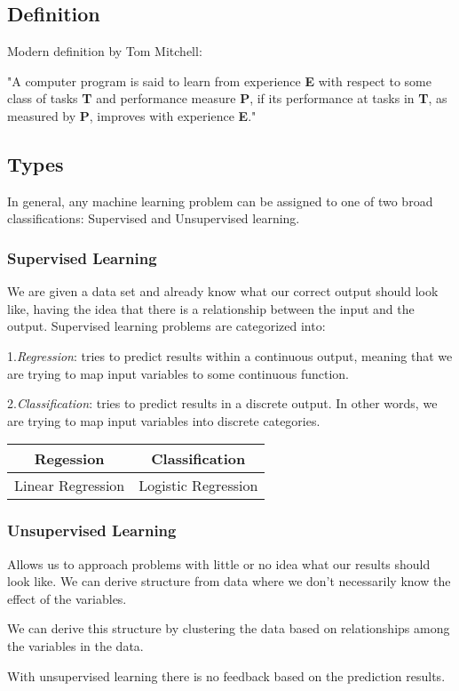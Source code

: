 \subsection{Definition}

Modern definition by Tom Mitchell: 
\begin{displayquote}
"A computer program is said to learn from experience \textbf{E} with respect to some class of tasks \textbf{T} and performance measure \textbf{P}, if its performance at tasks in \textbf{T}, as measured by \textbf{P}, improves with experience \textbf{E}."
\end{displayquote}

\subsection{Types}
In general, any machine learning problem can be assigned to one of two broad classifications: Supervised and Unsupervised learning.

\subsubsection{Supervised Learning}
We are given a data set and already know what our correct output should look like, having the idea that there is a relationship between the input and the output.
Supervised learning problems are categorized into:

1.\textit{Regression}: tries to predict results within a continuous output, meaning that we are trying to map input variables to some continuous function.

2.\textit{Classification}: tries to predict results in a discrete output. In other words, we are trying to map input variables into discrete categories.

\begin{center}
\begin{tabular}{ |c|c| } 
\hline
\textbf{Regession} & \textbf{Classification} \\
\hline
Linear Regression & Logistic Regression \\
\hline
\end{tabular}
\end{center}

\subsubsection{Unsupervised Learning}
Allows us to approach problems with little or no idea what our results should look like. We can derive structure from data where we don't necessarily know the effect of the variables.

We can derive this structure by clustering the data based on relationships among the variables in the data.

With unsupervised learning there is no feedback based on the prediction results.
